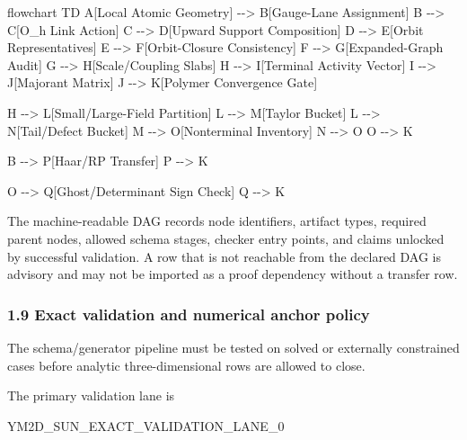 \documentclass[
]{article}
\newenvironment{Shaded}{}{}
\newcommand{\NormalTok}[1]{#1}
\begin{document}
\begin{Shaded}
\begin{Highlighting}[]
\NormalTok{flowchart TD}
\NormalTok{    A[Local Atomic Geometry] {-}{-}\textgreater{} B[Gauge{-}Lane Assignment]}
\NormalTok{    B {-}{-}\textgreater{} C[O\_h Link Action]}
\NormalTok{    C {-}{-}\textgreater{} D[Upward Support Composition]}
\NormalTok{    D {-}{-}\textgreater{} E[Orbit Representatives]}
\NormalTok{    E {-}{-}\textgreater{} F[Orbit{-}Closure Consistency]}
\NormalTok{    F {-}{-}\textgreater{} G[Expanded{-}Graph Audit]}
\NormalTok{    G {-}{-}\textgreater{} H[Scale/Coupling Slabs]}
\NormalTok{    H {-}{-}\textgreater{} I[Terminal Activity Vector]}
\NormalTok{    I {-}{-}\textgreater{} J[Majorant Matrix]}
\NormalTok{    J {-}{-}\textgreater{} K[Polymer Convergence Gate]}

\NormalTok{    H {-}{-}\textgreater{} L[Small/Large{-}Field Partition]}
\NormalTok{    L {-}{-}\textgreater{} M[Taylor Bucket]}
\NormalTok{    L {-}{-}\textgreater{} N[Tail/Defect Bucket]}
\NormalTok{    M {-}{-}\textgreater{} O[Nonterminal Inventory]}
\NormalTok{    N {-}{-}\textgreater{} O}
\NormalTok{    O {-}{-}\textgreater{} K}

\NormalTok{    B {-}{-}\textgreater{} P[Haar/RP Transfer]}
\NormalTok{    P {-}{-}\textgreater{} K}

\NormalTok{    O {-}{-}\textgreater{} Q[Ghost/Determinant Sign Check]}
\NormalTok{    Q {-}{-}\textgreater{} K}
\end{Highlighting}
\end{Shaded}

The machine-readable DAG records node identifiers, artifact types,
required parent nodes, allowed schema stages, checker entry points, and
claims unlocked by successful validation. A row that is not reachable
from the declared DAG is advisory and may not be imported as a proof
dependency without a transfer row.

\subsubsection{1.9 Exact validation and numerical anchor
policy}\label{exact-validation-and-numerical-anchor-policy}

The schema/generator pipeline must be tested on solved or externally
constrained cases before analytic three-dimensional rows are allowed to
close.

The primary validation lane is

\begin{Shaded}
\begin{Highlighting}[]
\NormalTok{YM2D\_SUN\_EXACT\_VALIDATION\_LANE\_0}
\end{Highlighting}
\end{Shaded}
\end{document}
